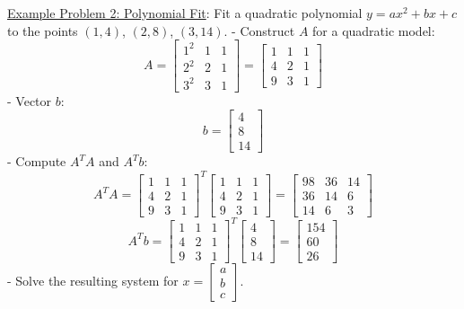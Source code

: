 \documentclass[8pt, a4paper, landscape]{extarticle} %
\begin{document}
\begin{multicols*}{4}
  \underline{Example Problem 2: Polynomial Fit}:
  Fit a quadratic polynomial \( y = ax^2 + bx + c \) to the points \((1, 4)\), \((2, 8)\), \((3, 14)\).
  - Construct \( A \) for a quadratic model:
  \[
    A = \begin{bmatrix} 1^2 & 1 & 1 \\ 2^2 & 2 & 1 \\ 3^2 & 3 & 1 \end{bmatrix} = \begin{bmatrix} 1 & 1 & 1 \\ 4 & 2 & 1 \\ 9 & 3 & 1 \end{bmatrix}
  \]
  - Vector \( b \):
  \[
    b = \begin{bmatrix} 4 \\ 8 \\ 14 \end{bmatrix}
  \]
  - Compute \( A^TA \) and \( A^Tb \):
  \[
    A^TA = \begin{bmatrix} 1 & 1 & 1 \\ 4 & 2 & 1 \\ 9 & 3 & 1 \end{bmatrix}^T \begin{bmatrix} 1 & 1 & 1 \\ 4 & 2 & 1 \\ 9 & 3 & 1 \end{bmatrix} = \begin{bmatrix} 98 & 36 & 14 \\ 36 & 14 & 6 \\ 14 & 6 & 3 \end{bmatrix}
  \]
  \[
    A^Tb = \begin{bmatrix} 1 & 1 & 1 \\ 4 & 2 & 1 \\ 9 & 3 & 1 \end{bmatrix}^T \begin{bmatrix} 4 \\ 8 \\ 14 \end{bmatrix} = \begin{bmatrix} 154 \\ 60 \\ 26 \end{bmatrix}
  \]
  - Solve the resulting system for \( x = \begin{bmatrix} a \\ b \\ c \end{bmatrix} \).



\end{multicols*}
\end{document}
